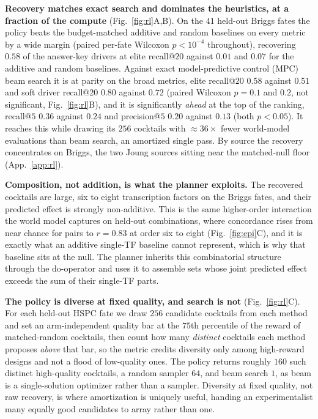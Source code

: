 \documentclass{article}
\begin{document}
\textbf{Recovery matches exact search and dominates the heuristics, at a fraction of the compute}
(Fig.~\ref{fig:rl}A,B). On the $41$ held-out Briggs fates the policy beats the budget-matched additive and random
baselines on every metric by a wide margin (paired per-fate Wilcoxon $p<10^{-4}$ throughout), recovering $0.58$ of
the answer-key drivers at elite recall@$20$ against $0.01$ and $0.07$ for the additive and random baselines.
Against exact model-predictive control (MPC) beam search it is at parity on the broad metrics, elite recall@$20$
$0.58$ against $0.51$ and soft driver recall@$20$ $0.80$ against $0.72$ (paired Wilcoxon $p{=}0.1$ and $0.2$, not
significant, Fig.~\ref{fig:rl}B), and it is significantly \emph{ahead} at the top of the ranking, recall@$5$
$0.36$ against $0.24$ and precision@$5$ $0.20$ against $0.13$ (both $p<0.05$). It reaches this while drawing its
$256$ cocktails with ${\approx}36\times$ fewer world-model evaluations than beam search, an amortized single pass.
By source the recovery concentrates on Briggs, the two Joung sources sitting near the matched-null floor
(App.~\ref{app:rl}).

\textbf{Composition, not addition, is what the planner exploits.} The recovered cocktails are large, six to eight
transcription factors on the Briggs fates, and their predicted effect is strongly non-additive. This is the same
higher-order interaction the world model captures on held-out combinations, where concordance rises from near
chance for pairs to $r{=}0.83$ at order six to eight (Fig.~\ref{fig:epi}C), and it is exactly what an additive
single-TF baseline cannot represent, which is why that baseline sits at the null. The planner inherits this
combinatorial structure through the do-operator and uses it to assemble sets whose joint predicted effect exceeds
the sum of their single-TF parts.

\textbf{The policy is diverse at fixed quality, and search is not} (Fig.~\ref{fig:rl}C). For each held-out HSPC
fate we draw $256$ candidate cocktails from each method and set an arm-independent quality bar at the $75$th
percentile of the reward of matched-random cocktails, then count how many \emph{distinct} cocktails each method
proposes \emph{above} that bar, so the metric credits diversity only among high-reward designs and not a flood of
low-quality ones. The policy returns roughly $160$ such distinct high-quality cocktails, a random sampler $64$,
and beam search $1$, as beam is a single-solution optimizer rather than a sampler. Diversity at fixed quality, not
raw recovery, is where amortization is uniquely useful, handing an experimentalist many equally good candidates to
array rather than one.
\end{document}
